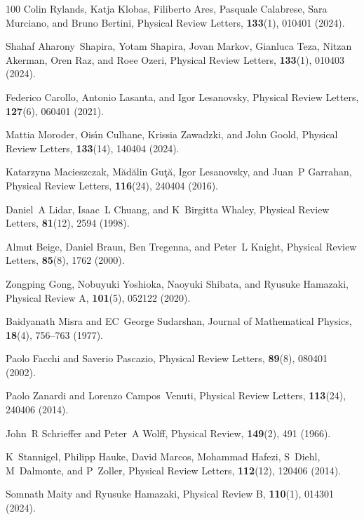 \documentclass[preprint,pteplogo]{ptephy_v2}%
\numberwithin{equation}{section}
\theoremstyle{definition}
\begin{document}
\begin{thebibliography}{100}
Colin Rylands, Katja Klobas, Filiberto Ares, Pasquale Calabrese, Sara Murciano, and Bruno Bertini, Physical Review Letters, {\bf 133}(1), 010401 (2024).

Shahaf Aharony~Shapira, Yotam Shapira, Jovan Markov, Gianluca Teza, Nitzan Akerman, Oren Raz, and Roee Ozeri, Physical Review Letters, {\bf 133}(1), 010403 (2024).

Federico Carollo, Antonio Lasanta, and Igor Lesanovsky, Physical Review Letters, {\bf 127}(6), 060401 (2021).

Mattia Moroder, Ois{\'\i}n Culhane, Krissia Zawadzki, and John Goold, Physical Review Letters, {\bf 133}(14), 140404 (2024).

Katarzyna Macieszczak, M{\u{a}}d{\u{a}}lin Gu{\c{t}}{\u{a}}, Igor Lesanovsky, and Juan~P Garrahan, Physical Review Letters, {\bf 116}(24), 240404 (2016).

Daniel~A Lidar, Isaac~L Chuang, and K~Birgitta Whaley, Physical Review Letters, {\bf 81}(12), 2594 (1998).

Almut Beige, Daniel Braun, Ben Tregenna, and Peter~L Knight, Physical Review Letters, {\bf 85}(8), 1762 (2000).

Zongping Gong, Nobuyuki Yoshioka, Naoyuki Shibata, and Ryusuke Hamazaki, Physical Review A, {\bf 101}(5), 052122 (2020).

Baidyanath Misra and EC~George Sudarshan, Journal of Mathematical Physics, {\bf 18}(4), 756--763 (1977).

Paolo Facchi and Saverio Pascazio, Physical Review Letters, {\bf 89}(8), 080401 (2002).

Paolo Zanardi and Lorenzo Campos~Venuti, Physical Review Letters, {\bf 113}(24), 240406 (2014).

John~R Schrieffer and Peter~A Wolff, Physical Review, {\bf 149}(2), 491 (1966).

K~Stannigel, Philipp Hauke, David Marcos, Mohammad Hafezi, S~Diehl, M~Dalmonte, and P~Zoller, Physical Review Letters, {\bf 112}(12), 120406 (2014).

Somnath Maity and Ryusuke Hamazaki, Physical Review B, {\bf 110}(1), 014301 (2024).


\end{thebibliography}
\end{document}
